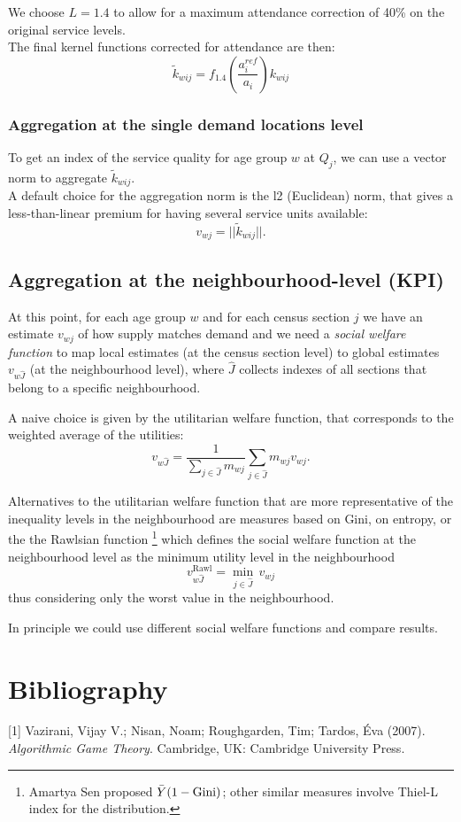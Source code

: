 \documentclass{article}
\begin{document}
We choose $L=1.4$ to allow for a maximum attendance correction of 40\% on the original service levels. \\
The final kernel functions corrected for attendance are then:
    \[\widetilde{k}_{wij} = f_{1.4}\left(\frac{a_i^{ref}}{a_i}\right)k_{wij}\]
    
\subsubsection{Aggregation at the single demand locations level}
To get an index of the service quality for age group $w$ at $Q_j$, we can use a vector norm to aggregate $\widetilde{k}_{wij}$.\\
A default choice for the aggregation norm is the l2 (Euclidean) norm, that gives a less-than-linear premium for having several service units available:
    \[v_{wj} = ||\widetilde{k}_{wij}||. \] 
\subsection{Aggregation at the neighbourhood-level (KPI)}
At this point, for each age group $w$ and for each census section $j$ we have an estimate $v_{wj}$ of how supply matches demand and we need a \textit{social welfare function} to map local estimates (at the census section level) to global estimates $v_{w\hat{J}}$ (at the neighbourhood level), where $\hat{J}$ collects indexes of all sections that belong to a specific neighbourhood.

A naive choice is given by the utilitarian welfare function, that corresponds to the weighted average of the utilities:
\[v_{w\hat{J}} = \frac{1}{\sum_{j \in \hat{J}} m_{wj}}\sum_{j \in \hat{J}} m_{wj} v_{wj}.
\]

Alternatives to the utilitarian welfare function that are more representative of the inequality levels in the neighbourhood are measures based on Gini, on entropy, or the the Rawlsian function \footnote{ Amartya Sen proposed $\Bar{Y}(1-\text{Gini})$; other similar measures involve Thiel-L index for the distribution.} which defines the social welfare function at the neighbourhood level as the minimum utility level in the neighbourhood
\[v^{\text{Rawl}}_{w\hat{J}} = \min_{j \in \hat{J}} \, v_{wj} \]
thus considering only the worst value in the neighbourhood.

In principle we could use different social welfare functions and compare results.

\section{Bibliography}
[1] Vazirani, Vijay V.; Nisan, Noam; Roughgarden, Tim; Tardos, Éva (2007). \textit{Algorithmic Game Theory}. Cambridge, UK: Cambridge University Press.
\end{document}
